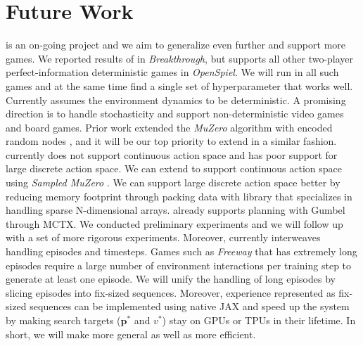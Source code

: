\chapter{Future Work}
\moozi is an on-going project and we aim to generalize \moozi even further and support more games.
We reported results of \moozi in \textit{Breakthrough}, but \moozi supports all other two-player perfect-information deterministic games in \textit{OpenSpiel}.
We will run \moozi in all such games and at the same time find a single set of hyperparameter that works well.
Currently \moozi assumes the environment dynamics to be deterministic.
A promising direction is to handle stochasticity and support non-deterministic video games and board games.
Prior work extended the \textit{MuZero} algorithm with encoded random nodes \cite{VectorQuantizedModels_Ozair.Li.ea_2021,PlanningStochasticEnvironments_Antonoglou.Schrittwieser.ea_2022}, and it will be our top priority to extend \moozi in a similar fashion.
\moozi currently does not support continuous action space and has poor support for large discrete action space.
We can extend \moozi to support continuous action space using \textit{Sampled MuZero} \cite{LearningPlanningComplex_Hubert.Schrittwieser.ea_2021}.
We can support large discrete action space better by reducing memory footprint through packing data with library that specializes in handling sparse N-dimensional arrays.
\moozi already supports planning with Gumbel \cite{PolicyImprovementPlanning_Danihelka.Guez.ea_2022} through MCTX.
We conducted preliminary experiments and we will follow up with a set of more rigorous experiments.
Moreover, \moozi currently interweaves handling episodes and timesteps.
Games such as \textit{Freeway} that has extremely long episodes require a large number of environment interactions per training step to generate at least one episode.
We will unify the handling of long episodes by slicing episodes into fix-sized sequences.
Moreover, experience represented as fix-sized sequences can be implemented using native JAX and speed up the system by making search targets (\(\mathbf{p}^{*}\) and $v^{*}$) stay on GPUs or TPUs in their lifetime.
In short, we will make \moozi more general as well as more efficient.